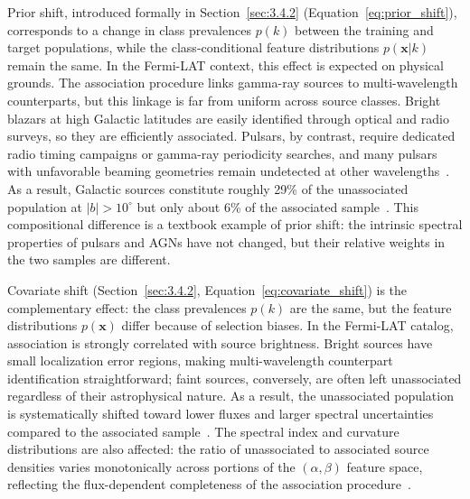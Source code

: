 Prior shift, introduced formally in Section~\ref{sec:3.4.2} (Equation~\ref{eq:prior_shift}), corresponds to a change in class prevalences $p(k)$ between the training and target populations, while the class-conditional feature distributions $p(\mathbf{x}|k)$ remain the same.
In the Fermi-LAT context, this effect is expected on physical grounds.
The association procedure links gamma-ray sources to multi-wavelength counterparts, but this linkage is far from uniform across source classes.
Bright blazars at high Galactic latitudes are easily identified through optical and radio surveys, so they are efficiently associated.
Pulsars, by contrast, require dedicated radio timing campaigns or gamma-ray periodicity searches, and many pulsars with unfavorable beaming geometries remain undetected at other wavelengths~\cite{2023RASTI...2..735M}.
As a result, Galactic sources constitute roughly 29\% of the unassociated population at $|b| > 10^\circ$ but only about 6\% of the associated sample~\cite{Amerio:2025fhz}.
This compositional difference is a textbook example of prior shift: the intrinsic spectral properties of pulsars and AGNs have not changed, but their relative weights in the two samples are different.

Covariate shift (Section~\ref{sec:3.4.2}, Equation~\ref{eq:covariate_shift}) is the complementary effect: the class prevalences $p(k)$ are the same, but the feature distributions $p(\mathbf{x})$ differ because of selection biases.
In the Fermi-LAT catalog, association is strongly correlated with source brightness.
Bright sources have small localization error regions, making multi-wavelength counterpart identification straightforward; faint sources, conversely, are often left unassociated regardless of their astrophysical nature.
As a result, the unassociated population is systematically shifted toward lower fluxes and larger spectral uncertainties compared to the associated sample~\cite{2023RASTI...2..735M, Amerio:2025fhz}.
The spectral index and curvature distributions are also affected: the ratio of unassociated to associated source densities varies monotonically across portions of the $(\alpha, \beta)$ feature space, reflecting the flux-dependent completeness of the association procedure~\cite{Amerio:2025fhz}.

